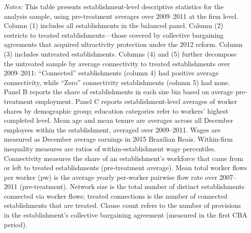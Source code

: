 \begin{table}[H]
\begin{threeparttable}
\begin{tablenotes}
    \item \textit{Notes:} This table presents establishment-level descriptive statistics for the analysis sample, using pre-treatment averages over 2009--2011 at the firm level. Column (1) includes all establishments in the balanced panel. Column (2) restricts to treated establishments---those covered by collective bargaining agreements that acquired ultractivity protection under the 2012 reform. Column (3) includes untreated establishments. Columns (4) and (5) further decompose the untreated sample by average connectivity to treated establishments over 2009--2011: ``Connected'' establishments (column 4) had positive average connectivity, while ``Zero'' connectivity establishments (column 5) had none. Panel B reports the share of establishments in each size bin based on average pre-treatment employment. Panel C reports establishment-level averages of worker shares by demographic group; education categories refer to workers' highest completed level. Mean age and mean tenure are averages across all December employees within the establishment, averaged over 2009--2011. Wages are measured as December average earnings in 2015 Brazilian Reais. Within-firm inequality measures are ratios of within-establishment wage percentiles. Connectivity measures the share of an establishment's workforce that came from or left to treated establishments (pre-treatment average). Mean total worker flows per worker (pw) is the average yearly per-worker pairwise flow rate over 2007--2011 (pre-treatment). Network size is the total number of distinct establishments connected via worker flows; treated connections is the number of connected establishments that are treated. Clause count refers to the number of provisions in the establishment's collective bargaining agreement (measured in the first CBA period).
\end{tablenotes}
\end{threeparttable}
\end{table}